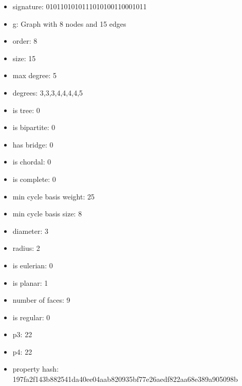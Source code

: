 \begin{itemize}
\item signature: 0101101010111010100110001011
\item g: Graph with 8 nodes and 15 edges
\item order: 8
\item size: 15
\item max degree: 5
\item degrees: 3,3,3,4,4,4,4,5
\item is tree: 0
\item is bipartite: 0
\item has bridge: 0
\item is chordal: 0
\item is complete: 0
\item min cycle basis weight: 25
\item min cycle basis size: 8
\item diameter: 3
\item radius: 2
\item is eulerian: 0
\item is planar: 1
\item number of faces: 9
\item is regular: 0
\item p3: 22
\item p4: 22
\item property hash: 197fa2f143b882541da40ee04aab820935bf77e26aedf822aa68e389a905098b
\end{itemize}
\newpage
\begin{figure}
\end{figure}
